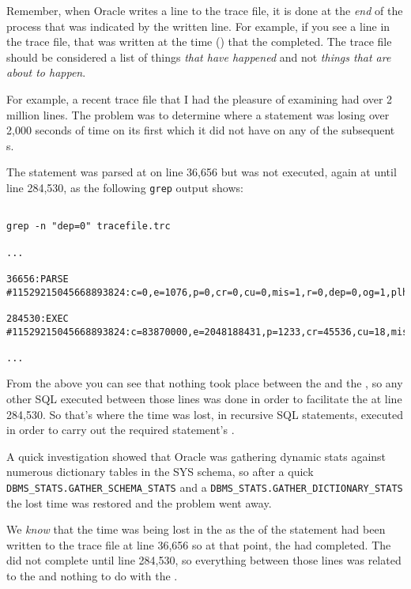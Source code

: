 \begin{note}
Remember, when Oracle writes a line to the trace file, it is done at the \emph{end} of the process that was indicated by the written line. For example, if you see a  line in the trace file, that was written at the time () that the  completed. The trace file should be considered a list of things \emph{that have happened} and not \emph{things that are about to happen}.
\end{note}

For example, a recent trace file that I had the pleasure of examining had over 2 million lines. The problem was to determine where a statement was losing over 2,000 seconds of time on its first  which it did not have on any of the subsequent s.

The statement was parsed at  on line 36,656 but was not executed, again at  until line 284,530, as the following \texttt{grep} output shows:

\begin{lstlisting}[numbers=none,caption={Oracle 11g Problem Trace - \texttt{grep} output}]

grep -n "dep=0" tracefile.trc

...

36656:PARSE #11529215045668893824:c=0,e=1076,p=0,cr=0,cu=0,mis=1,r=0,dep=0,og=1,plh=0,tim=26375808573637

284530:EXEC #11529215045668893824:c=83870000,e=2048188431,p=1233,cr=45536,cu=18,mis=1,r=1,dep=0,og=1,plh=0,tim=26377856794348

...
\end{lstlisting}

From the above you can see that nothing took place between the  and the , so any other SQL executed between those lines was done in order to facilitate the  at line 284,530. So that's where the time was lost, in recursive SQL statements, executed in order to carry out the required statement's . 

A quick investigation showed that Oracle was gathering dynamic stats against numerous dictionary tables in the SYS schema, so after a quick \texttt{DBMS\_STATS.GATHER\_SCHEMA\_STATS} and a \texttt{DBMS\_STATS.GATHER\_DICTIONARY\_STATS} the lost time was restored and the problem went away.

We \emph{know} that the time was being lost in the  as the  of the statement had been written to the trace file at line 36,656 so at that point, the  had completed. The  did not complete until line 284,530, so everything between those lines was related to the  and nothing to do with the .

